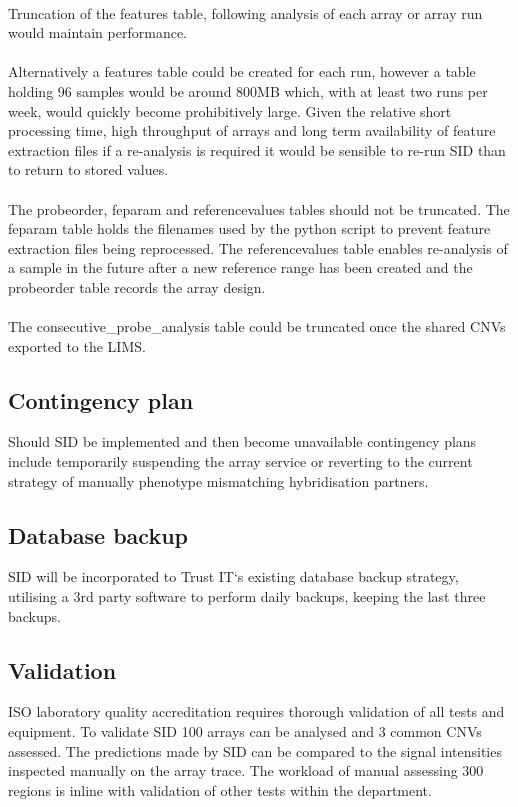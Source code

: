 \paragraph*{}
Truncation of the features table, following analysis of each array or array run would maintain performance.
\paragraph*{}
Alternatively a features table could be created for each run, however a table holding 96 samples would be around 800MB which, with at least two runs per week, would quickly become prohibitively large. Given the relative short processing time, high throughput of arrays and long term availability of feature extraction files if a re-analysis is required it would be sensible to re-run SID than to return to stored values.
\paragraph*{}
The probeorder, feparam and referencevalues tables should not be truncated. The feparam table holds the filenames used by the python script to prevent feature extraction files being reprocessed.  The referencevalues table enables re-analysis of a sample in the future after a new reference range has been created and the probeorder table records the array design.
\paragraph*{}
The consecutive\_probe\_analysis table could be truncated once the shared CNVs exported to the LIMS.

\subsection{Contingency plan}
Should SID be implemented and then become unavailable contingency plans include temporarily suspending the array service or reverting to the current strategy of manually phenotype mismatching hybridisation partners.
\subsection{Database backup}
SID will be incorporated to Trust IT`s existing database backup strategy, utilising a 3rd party software to perform daily backups, keeping the last three backups. 

\subsection{Validation}
ISO laboratory quality accreditation requires thorough validation of all tests and equipment. To validate SID 100 arrays can be analysed and 3 common CNVs assessed. The predictions made by SID can be compared to the signal intensities inspected manually on the array trace. The workload of manual assessing 300 regions is inline with validation of other tests within the department.

